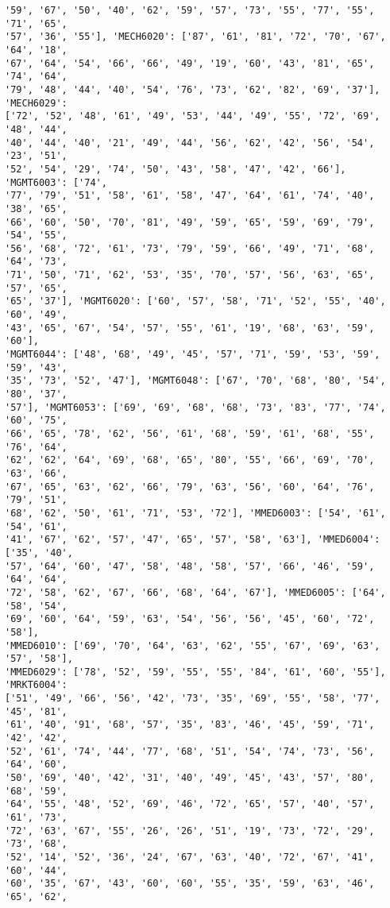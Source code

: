 \documentclass[11pt]{article}
\begin{document}
\begin{Verbatim}[commandchars=\\\{\}]
'59', '67', '50', '40', '62', '59', '57', '73', '55', '77', '55', '71', '65',
'57', '36', '55'], 'MECH6020': ['87', '61', '81', '72', '70', '67', '64', '18',
'67', '64', '54', '66', '66', '49', '19', '60', '43', '81', '65', '74', '64',
'79', '48', '44', '40', '54', '76', '73', '62', '82', '69', '37'], 'MECH6029':
['72', '52', '48', '61', '49', '53', '44', '49', '55', '72', '69', '48', '44',
'40', '44', '40', '21', '49', '44', '56', '62', '42', '56', '54', '23', '51',
'52', '54', '29', '74', '50', '43', '58', '47', '42', '66'], 'MGMT6003': ['74',
'77', '79', '51', '58', '61', '58', '47', '64', '61', '74', '40', '38', '65',
'66', '60', '50', '70', '81', '49', '59', '65', '59', '69', '79', '54', '55',
'56', '68', '72', '61', '73', '79', '59', '66', '49', '71', '68', '64', '73',
'71', '50', '71', '62', '53', '35', '70', '57', '56', '63', '65', '57', '65',
'65', '37'], 'MGMT6020': ['60', '57', '58', '71', '52', '55', '40', '60', '49',
'43', '65', '67', '54', '57', '55', '61', '19', '68', '63', '59', '60'],
'MGMT6044': ['48', '68', '49', '45', '57', '71', '59', '53', '59', '59', '43',
'35', '73', '52', '47'], 'MGMT6048': ['67', '70', '68', '80', '54', '80', '37',
'57'], 'MGMT6053': ['69', '69', '68', '68', '73', '83', '77', '74', '60', '75',
'66', '65', '78', '62', '56', '61', '68', '59', '61', '68', '55', '76', '64',
'62', '62', '64', '69', '68', '65', '80', '55', '66', '69', '70', '63', '66',
'67', '65', '63', '62', '66', '79', '63', '56', '60', '64', '76', '79', '51',
'68', '62', '50', '61', '71', '53', '72'], 'MMED6003': ['54', '61', '54', '61',
'41', '67', '62', '57', '47', '65', '57', '58', '63'], 'MMED6004': ['35', '40',
'57', '64', '60', '47', '58', '48', '58', '57', '66', '46', '59', '64', '64',
'72', '58', '62', '67', '66', '68', '64', '67'], 'MMED6005': ['64', '58', '54',
'69', '60', '64', '59', '63', '54', '56', '56', '45', '60', '72', '58'],
'MMED6010': ['69', '70', '64', '63', '62', '55', '67', '69', '63', '57', '58'],
'MMED6029': ['78', '52', '59', '55', '55', '84', '61', '60', '55'], 'MRKT6004':
['51', '49', '66', '56', '42', '73', '35', '69', '55', '58', '77', '45', '81',
'61', '40', '91', '68', '57', '35', '83', '46', '45', '59', '71', '42', '42',
'52', '61', '74', '44', '77', '68', '51', '54', '74', '73', '56', '64', '60',
'50', '69', '40', '42', '31', '40', '49', '45', '43', '57', '80', '68', '59',
'64', '55', '48', '52', '69', '46', '72', '65', '57', '40', '57', '61', '73',
'72', '63', '67', '55', '26', '26', '51', '19', '73', '72', '29', '73', '68',
'52', '14', '52', '36', '24', '67', '63', '40', '72', '67', '41', '60', '44',
'60', '35', '67', '43', '60', '60', '55', '35', '59', '63', '46', '65', '62',

\end{Verbatim}
\end{document}
